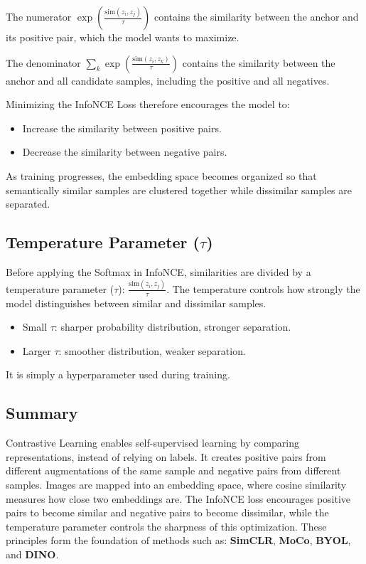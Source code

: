 The numerator $\exp\left( \frac{\text{sim}(z_i, z_j)}{\tau} \right)$ contains the similarity between the anchor and its positive pair, which the model wants to maximize.

The denominator $\sum_{k} \exp\left( \frac{\text{sim}(z_i, z_k)}{\tau} \right)$ contains the similarity between the anchor and all candidate samples, including the positive and all negatives.

Minimizing the InfoNCE Loss therefore encourages the model to:
\begin{itemize}
    \item Increase the similarity between positive pairs.
    \item Decrease the similarity between negative pairs.
\end{itemize}

As training progresses, the embedding space becomes organized so that semantically similar samples are clustered together while dissimilar samples are separated.

\subsection{Temperature Parameter \texorpdfstring{($\tau$)}{(tau)}}

Before applying the Softmax in InfoNCE, similarities are divided by a temperature parameter ($\tau$): $\frac{\text{sim}(z_i, z_j)}{\tau}$. The temperature controls how strongly the model distinguishes between similar and dissimilar samples.
\begin{itemize}
    \item Small $\tau$: sharper probability distribution, stronger separation.
    \item Larger $\tau$: smoother distribution, weaker separation.
\end{itemize}

It is simply a hyperparameter used during training.

\subsection*{Summary}
Contrastive Learning enables self-supervised learning by comparing representations, instead of relying on labels. It creates positive pairs from different augmentations of the same sample and negative pairs from different samples. Images are mapped into an embedding space, where cosine similarity measures how close two embeddings are. The InfoNCE loss encourages positive pairs to become similar and negative pairs to become dissimilar, while the temperature parameter controls the sharpness of this optimization. These principles form the foundation of methods such as: \textbf{SimCLR}, \textbf{MoCo}, \textbf{BYOL}, and \textbf{DINO}.

